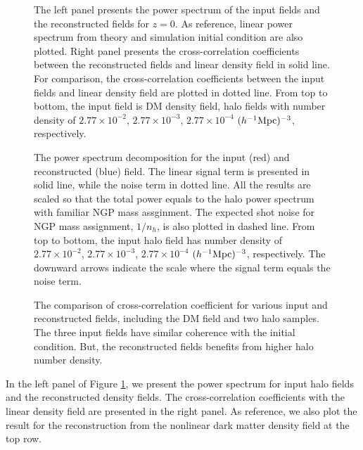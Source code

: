 \documentclass[iop]{emulateapj}
\newcommand{\mpch}{h^{-1} {\rm Mpc}}
\begin{document}
{%
\begin{figure*}
\epsfxsize=8.5cm
\epsfxsize=8.5cm
\caption{The left panel presents the power spectrum of the input fields and the reconstructed fields for $z=0$.
As reference, linear power spectrum from theory and simulation initial condition are also plotted.
Right panel presents the cross-correlation coefficients between the reconstructed fields and linear density field in solid line.
For comparison, the cross-correlation coefficients between the input fields and linear density field are plotted in dotted line.
From top to bottom, the input field is DM density field, halo fields with number density of $2.77\times 10^{-2}$, $2.77\times 10^{-3}$, $2.77\times 10^{-4}$ $(\mpch)^{-3}$, respectively.}
\label{fig:powercc}
\end{figure*}

\begin{figure}
\epsfxsize=8.5cm
\caption{The power spectrum decomposition for the input (red) and reconstructed (blue) field.
The linear signal term is presented in solid line, while the noise term in dotted line.
All the results are scaled so that the total power equals to the halo power spectrum with familiar NGP mass assginment.
The expected shot noise for NGP mass assignment, $1/n_h$, is also plotted in dashed line.
From top to bottom, the input halo field has number density of $2.77\times 10^{-2}$, $2.77\times 10^{-3}$, $2.77\times 10^{-4}$ $(\mpch)^{-3}$, respectively.
The downward arrows indicate the scale where the signal term equals the noise term.}
\label{fig:decom}
\end{figure}

\begin{figure}
\epsfxsize=8.5cm
\caption{The comparison of cross-correlation coefficient for various input and reconstructed fields, including
the DM field and two halo samples.
The three input fields have similar coherence with the initial condition.
But, the reconstructed fields benefits from higher halo number density.}
\label{fig:ccnh}
\end{figure}

In the left panel of Figure \ref{fig:powercc}, we present the power spectrum for input halo fields and the reconstructed density fields.
The cross-correlation coefficients with the linear density field are presented in the right panel.
As reference, we also plot the result for the reconstruction from the nonlinear dark matter density field at the top row.

}
\end{document}
